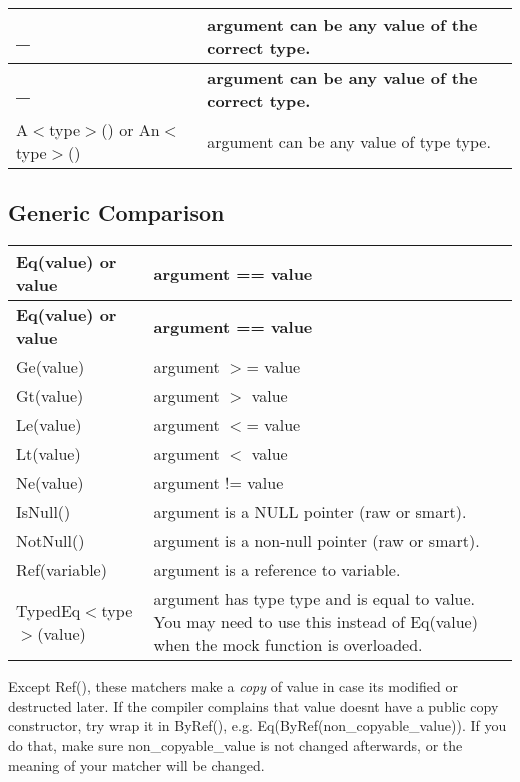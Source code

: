\tabulinesep=1mm
\begin{longtabu} spread 0pt [c]{*{2}{|X[-1]}|}
\hline
\rowcolor{\tableheadbgcolor}\textbf{ {\ttfamily \+\_\+}}&\textbf{ {\ttfamily argument} can be any value of the correct type.  }\\
\endfirsthead
\hline
\endfoot
\hline
\rowcolor{\tableheadbgcolor}\textbf{ {\ttfamily \+\_\+}}&\textbf{ {\ttfamily argument} can be any value of the correct type.  }\\
\endhead
{\ttfamily A$<$type$>$()} or {\ttfamily An$<$type$>$()}&{\ttfamily argument} can be any value of type {\ttfamily type}. \\
\end{longtabu}
\subsection*{Generic Comparison}

\tabulinesep=1mm
\begin{longtabu} spread 0pt [c]{*{2}{|X[-1]}|}
\hline
\rowcolor{\tableheadbgcolor}\textbf{ {\ttfamily Eq(value)} or {\ttfamily value}}&\textbf{ {\ttfamily argument == value}  }\\
\endfirsthead
\hline
\endfoot
\hline
\rowcolor{\tableheadbgcolor}\textbf{ {\ttfamily Eq(value)} or {\ttfamily value}}&\textbf{ {\ttfamily argument == value}  }\\
\endhead
{\ttfamily Ge(value)} &{\ttfamily argument $>$= value} \\
{\ttfamily Gt(value)} &{\ttfamily argument $>$ value} \\
{\ttfamily Le(value)} &{\ttfamily argument $<$= value} \\
{\ttfamily Lt(value)} &{\ttfamily argument $<$ value} \\
{\ttfamily Ne(value)} &{\ttfamily argument != value} \\
{\ttfamily Is\+Null()} &{\ttfamily argument} is a {\ttfamily N\+U\+LL} pointer (raw or smart). \\
{\ttfamily Not\+Null()} &{\ttfamily argument} is a non-\/null pointer (raw or smart). \\
{\ttfamily Ref(variable)} &{\ttfamily argument} is a reference to {\ttfamily variable}. \\
{\ttfamily Typed\+Eq$<$type$>$(value)}&{\ttfamily argument} has type {\ttfamily type} and is equal to {\ttfamily value}. You may need to use this instead of {\ttfamily Eq(value)} when the mock function is overloaded. \\
\end{longtabu}
Except {\ttfamily Ref()}, these matchers make a {\itshape copy} of {\ttfamily value} in case it\textquotesingle{}s modified or destructed later. If the compiler complains that {\ttfamily value} doesn\textquotesingle{}t have a public copy constructor, try wrap it in {\ttfamily By\+Ref()}, e.\+g. {\ttfamily Eq(\+By\+Ref(non\+\_\+copyable\+\_\+value))}. If you do that, make sure {\ttfamily non\+\_\+copyable\+\_\+value} is not changed afterwards, or the meaning of your matcher will be changed.

